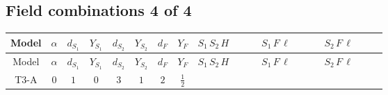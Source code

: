 \documentclass[8pt]{article}
\begin{document}
\begin{landscape}
\subsection*{Field combinations 4 of 4}
\begin{longtable}{@{}cccccccc >{\raggedright\arraybackslash}p{0.21\linewidth} >{\raggedright\arraybackslash}p{0.21\linewidth} >{\raggedright\arraybackslash}p{0.21\linewidth}@{}}
\toprule
Model & $\alpha$ & $d_{S_1}$ & $Y_{S_1}$ & $d_{S_2}$ & $Y_{S_2}$ & $d_F$ & $Y_F$ & $S_1\,S_2\,H$ & $S_1\,F\,\ell$ & $S_2\,F\,\ell$ \\
\midrule
\endfirsthead
\toprule
Model & $\alpha$ & $d_{S_1}$ & $Y_{S_1}$ & $d_{S_2}$ & $Y_{S_2}$ & $d_F$ & $Y_F$ & $S_1\,S_2\,H$ & $S_1\,F\,\ell$ & $S_2\,F\,\ell$ \\
\midrule
\endhead
T3-A & $0$ & $1$ & $0$ & $3$ & $1$ & $2$ & $\frac{1}{2}$ & \scriptsize\adjustbox{max width=\linewidth}{$\begin{gathered} +\overline{\lambda_5} S_{2,j_1} {\mathcal{I}_{T3}}^{*}_{a_1,a_2,j_1} H_{a_1}{}^{\dagger } H_{a_2}{}^{\dagger } S_1{}^{\dagger } \\ +H_{a_1} H_{a_2} S_1 \mathcal{I}_{T3,a_1,a_2,j_1} \lambda_5 S_{2,j_1}{}^{\dagger }\end{gathered}$} & \scriptsize\adjustbox{max width=\linewidth}{$\begin{gathered} +\overline{L_{a_1,i_1}}\, C\, P_R\, \overline{F_{j_1,r_1}}{}^T S_1 y_{1,i_1,r_1} \mathcal{I}_{y_1,a_1,j_1} \\ +\overline{y_{1,i_1,r_1}} L_{a_1,i_1}{}^T\, C\, P_L\, F_{j_1,r_1} {\mathcal{I}_{y_1}}^{*}_{a_1,j_1} S_1{}^{\dagger }\end{gathered}$} & \scriptsize\adjustbox{max width=\linewidth}{$\begin{gathered} +\overline{y_{2,i_1,r_1}} \overline{F_{j_1,r_1}}\, P_L\, L_{a_1,i_1} S_{2,j_1} {\mathcal{I}_{y_2}}^{*}_{a_1,j_1,j_1} \\ +\overline{L_{a_1,i_1}}\, P_R\, F_{j_1,r_1} y_{2,i_1,r_1} \mathcal{I}_{y_2,a_1,j_1,j_1} S_{2,j_1}{}^{\dagger }\end{gathered}$} \\
\midrule

\end{longtable}
\end{landscape}
\end{document}
